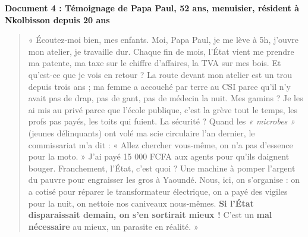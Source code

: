 \documentclass[11pt]{article}
\begin{document}
\medskip
\noindent\textbf{Document 4 : Témoignage de Papa Paul, 52 ans, menuisier, résident à Nkolbisson depuis 20 ans}
\begin{quote}
« Écoutez-moi bien, mes enfants. Moi, Papa Paul, je me lève à 5h, j'ouvre mon atelier, je travaille dur. Chaque fin de mois, l'État vient me prendre ma patente, ma taxe sur le chiffre d'affaires, la TVA sur mes bois. Et qu'est-ce que je vois en retour ? 
La route devant mon atelier est un trou depuis trois ans ; ma femme a accouché par terre au CSI parce qu'il n'y avait pas de drap, pas de gant, pas de médecin la nuit. Mes gamins ? Je les ai mis au privé parce que l'école publique, c'est la grève tout le temps, les profs pas payés, les toits qui fuient. 
La sécurité ? Quand les \emph{« microbes »} (jeunes délinquants) ont volé ma scie circulaire l'an dernier, le commissariat m'a dit : « Allez chercher vous-même, on n'a pas d'essence pour la moto. » J'ai payé 15 000 FCFA aux agents pour qu'ils daignent bouger. 
Franchement, l'État, c'est quoi ? Une machine à pomper l'argent du pauvre pour engraisser les gros à Yaoundé. Nous, ici, on s'organise : on a cotisé pour réparer le transformateur électrique, on a payé des vigiles pour la nuit, on nettoie nos caniveaux nous-mêmes. \textbf{Si l'État disparaissait demain, on s'en sortirait mieux !} C'est un \textbf{mal nécessaire} au mieux, un parasite en réalité. »
\end{quote}
\end{document}
